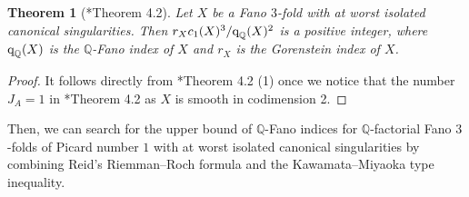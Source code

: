 \documentclass[12pt,twoside]{amsart}
\newcommand{\qQ}{\text{\rm q}_{\mathbb{Q}}}
\newtheorem{thm}{Theorem}[section]
\theoremstyle{definition}
\begin{document}
\begin{thm}[\cite{jiang-liu-liu}*{Theorem 4.2}]\label{thm.degreeandindex}
    Let $X$ be a Fano $3$-fold with at worst isolated canonical singularities. Then $r_Xc_1(X)^3/\qQ(X)^2$ is a positive integer, where $\qQ(X)$ is the $\mathbb Q$-Fano index of $X$ and $r_X$ is the Gorenstein index of $X$.
\end{thm}

\begin{proof}
    It follows directly from \cite{jiang-liu-liu}*{Theorem 4.2 (1)} once we notice that the number $J_A=1$ in \cite{jiang-liu-liu}*{Theorem 4.2} as $X$ is smooth in codimension 2.
\end{proof}

Then, we can search for the upper bound of $\mathbb Q$-Fano indices for $\mathbb Q$-factorial Fano $3$-folds of Picard number $1$ with at worst isolated canonical singularities by combining Reid's Riemman--Roch formula and the Kawamata--Miyaoka type inequality.
\end{document}
